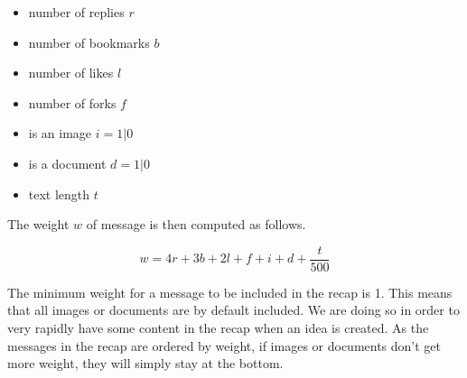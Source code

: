 \documentclass[a4paper,12pt, oneside]{article}
\begin{document}
\begin{multicols}{2}
    \begin{itemize}
        \item number of replies $r$
        \item number of bookmarks $b$
        \item number of likes $l$
        \item number of forks $f$
        \item is an image $i = 1 | 0$
        \item is a document $d = 1 | 0$
        \item text length $t$
    \end{itemize}
\end{multicols}

The weight $w$ of message is then computed as follows.

\begin{equation}
    \label{eq.messageWeightInRecap}
    w = 4r + 3b + 2l + f + i + d + \frac{t}{500}
\end{equation}

The minimum weight for a message to be included in the recap is 1.
This means that all images or documents are by default included.
We are doing so in order to very rapidly have some content in the recap when an idea is created.
As the messages in the recap are ordered by weight, if images or documents don't get more weight, they will simply stay at the bottom.
\end{document}

